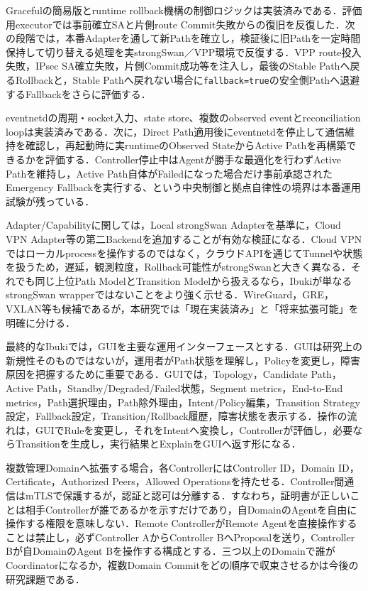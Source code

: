 \documentclass[11pt,a4paper,twoside]{ltjsarticle}
\begin{document}
Gracefulの簡易版とruntime rollback機構の制御ロジックは実装済みである．評価用executorでは事前確立SAと片側route Commit失敗からの復旧を反復した．次の段階では，本番Adapterを通して新Pathを確立し，検証後に旧Pathを一定時間保持して切り替える処理を実strongSwan／VPP環境で反復する．VPP route投入失敗，IPsec SA確立失敗，片側Commit成功等を注入し，最後のStable Pathへ戻るRollbackと，Stable Pathへ戻れない場合に\texttt{fallback=true}の安全側Pathへ退避するFallbackをさらに評価する．

eventnetdの周期・socket入力、state store、複数のobserved eventとreconciliation loopは実装済みである．次に，Direct Path適用後にeventnetdを停止して通信維持を確認し，再起動時に実runtimeのObserved StateからActive Pathを再構築できるかを評価する．Controller停止中はAgentが勝手な最適化を行わずActive Pathを維持し，Active Path自体がFailedになった場合だけ事前承認されたEmergency Fallbackを実行する、という中央制御と拠点自律性の境界は本番運用試験が残っている．

Adapter/Capabilityに関しては，Local strongSwan Adapterを基準に，Cloud VPN Adapter等の第二Backendを追加することが有効な検証になる．Cloud VPNではローカルprocessを操作するのではなく，クラウドAPIを通じてTunnelや状態を扱うため，遅延，観測粒度，Rollback可能性がstrongSwanと大きく異なる．それでも同じ上位Path ModelとTransition Modelから扱えるなら，Ibukiが単なるstrongSwan wrapperではないことをより強く示せる．WireGuard，GRE，VXLAN等も候補であるが，本研究では「現在実装済み」と「将来拡張可能」を明確に分ける．

最終的なIbukiでは，GUIを主要な運用インターフェースとする．GUIは研究上の新規性そのものではないが，運用者がPath状態を理解し，Policyを変更し，障害原因を把握するために重要である．GUIでは，Topology，Candidate Path，Active Path，Standby/Degraded/Failed状態，Segment metrics，End-to-End metrics，Path選択理由，Path除外理由，Intent/Policy編集，Transition Strategy設定，Fallback設定，Transition/Rollback履歴，障害状態を表示する．操作の流れは，GUIでRuleを変更し，それをIntentへ変換し，Controllerが評価し，必要ならTransitionを生成し，実行結果とExplainをGUIへ返す形になる．

複数管理Domainへ拡張する場合，各ControllerにはController ID，Domain ID，Certificate，Authorized Peers，Allowed Operationsを持たせる．Controller間通信はmTLSで保護するが，認証と認可は分離する．すなわち，証明書が正しいことは相手Controllerが誰であるかを示すだけであり，自DomainのAgentを自由に操作する権限を意味しない．Remote ControllerがRemote Agentを直接操作することは禁止し，必ずController AからController BへProposalを送り，Controller Bが自DomainのAgent Bを操作する構成とする．三つ以上のDomainで誰がCoordinatorになるか，複数Domain Commitをどの順序で収束させるかは今後の研究課題である．
\end{document}
